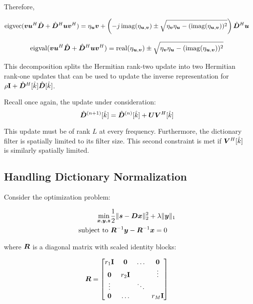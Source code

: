 Therefore, 

\begin{equation}
\operatorname{eigvec}
(
\bm{v}\bm{u}^H\hat{\bm{D}} + \hat{\bm{D}}^H\bm{u}\bm{v}^H
) = 
\eta_{\bm{u}}\bm{v} +
\left(-j\operatorname{imag}(\eta_{\bm{u},\bm{v}}) \pm \sqrt{\eta_{\bm{v}} \eta_{\bm{u}} - (\operatorname{imag}(\eta_{\bm{u},\bm{v}}))^2}\right)\hat{\bm{D}}^H\bm{u}
\end{equation}


\begin{equation}
\operatorname{eigval}(
\bm{v}\bm{u}^H\hat{\bm{D}} + \hat{\bm{D}}^H\bm{u}\bm{v}^H
)
= \operatorname{real}(\eta_{\bm{u},\bm{v}}) \pm \sqrt{\eta_{\bm{v}}\eta_{\bm{u}} - (\operatorname{imag}(\eta_{\bm{u},\bm{v}}))^2}
\end{equation}

This decomposition splits the Hermitian rank-two update into two Hermitian rank-one updates that can be used to update the inverse representation for $\rho{\bf I} + \hat{\bm{D}}^H[\hat{k}]\hat{\bm{D}}[\hat{k}]$.

Recall once again, the update under consideration:
\begin{equation}
\hat{\bm{D}}^{(n + 1)}[\hat{k}] = \hat{\bm{D}}^{(n)}[\hat{k}] + \bm{U}\bm{V}^H[\hat{k}]
\end{equation}

This update must be of rank $L$ at every frequency. Furthermore, the dictionary filter is spatially limited to its filter size. This second constraint is met if $\bm{V}^H[\hat{k}]$ is similarly spatially limited.

\subsection{Handling Dictionary Normalization}
Consider the optimization problem:

\begin{equation}
\begin{aligned}
\min_{\bm{x},\bm{y},\bm{z}} & \frac{1}{2}\|\bm{s} -\bm{D}\bm{x}\|_2^2 + \lambda\|\bm{y}\|_1 \\
\text{subject to } & \bm{R}^{-1}\bm{y} - \bm{R}^{-1}\bm{x} = 0 
\end{aligned}
\end{equation}

where $\bm{R}$ is a diagonal matrix with scaled identity blocks:

\begin{equation}
\bm{R} = \begin{bmatrix} r_1{\bf I} & \bm{0} & \hdots & \bm{0} \\ \bm{0} & r_2{\bf I} &  & \vdots \\ \vdots &  & \ddots &   \\ \bm{0} & \hdots &  & r_M{\bf I} \end{bmatrix}
\end{equation}


